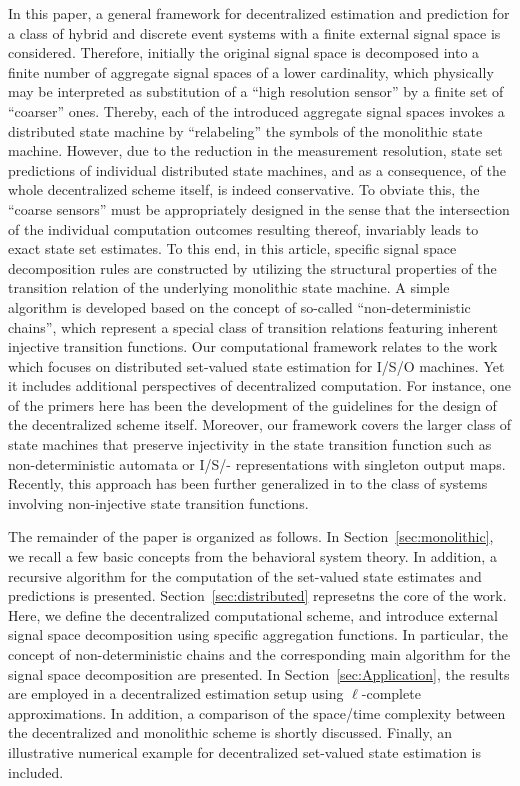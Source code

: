 \documentclass[a4paper, 10pt, conference]{ieeeconf}
\begin{document}
In this paper, a general framework for decentralized estimation and prediction for a class of hybrid and discrete event systems with a finite external signal space is considered. Therefore, initially the original signal space is decomposed into a finite number of aggregate signal spaces of a lower cardinality, which physically may be interpreted as substitution of a ``high resolution sensor'' by a finite set of ``coarser'' ones. Thereby, each of the introduced aggregate signal spaces invokes a distributed state machine by ``relabeling'' the symbols of the  monolithic state machine. However, due to the reduction in the measurement resolution, state set predictions of individual distributed state machines, and as a consequence, of the whole decentralized scheme itself, is indeed  conservative. To obviate this, the ``coarse sensors'' must be appropriately designed in the sense that the intersection of the individual computation outcomes resulting thereof, invariably leads to exact state set estimates. To this end, in this article, specific signal space decomposition rules are constructed by utilizing the structural properties of the transition relation of the underlying monolithic state machine. A simple algorithm is developed based on the concept of so-called ``non-deterministic chains'', which represent a special class of transition relations featuring inherent injective transition functions.
Our computational framework relates to the work \cite{wodes2010} which focuses on distributed set-valued state estimation for I/S/O machines. Yet it includes additional perspectives of decentralized computation. For instance, one of the primers here has been the development of the guidelines for the design of the decentralized scheme itself. Moreover, our framework covers the larger class of state machines that preserve injectivity in the state transition function such as non-deterministic automata or I/S/- representations with singleton output maps. Recently, this approach has been further generalized in \cite{bajc_rom:2011} to the class of systems involving  non-injective state transition functions.

The remainder of the paper is organized as follows. In Section~\ref{sec:monolithic}, we recall a few basic concepts from the behavioral system theory. In addition, a recursive algorithm for the computation of the set-valued state estimates and predictions is presented. Section~\ref{sec:distributed} represetns the core of the work. Here, we define the decentralized computational scheme, and introduce external signal space decomposition using specific aggregation functions. In particular, the concept of {non-deterministic chains} and the corresponding main algorithm for the signal space decomposition are presented. In Section~\ref{sec:Application}, the results are employed in a decentralized estimation setup using $\ell$-complete approximations. In addition, a comparison of the space/time complexity between the decentralized and monolithic scheme is shortly discussed. Finally, an illustrative numerical example for decentralized set-valued state estimation is included.
\end{document}

